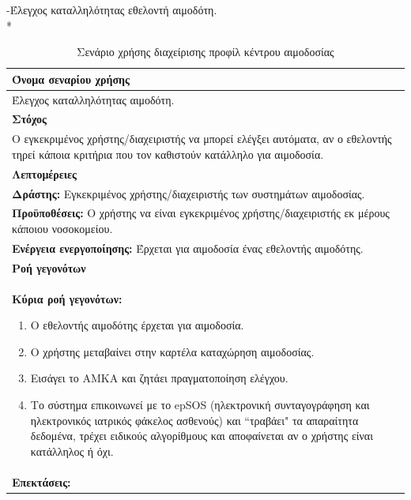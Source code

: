 \newpage
-Έλεγχος καταλληλότητας εθελοντή αιμοδότη.
\\*
\begin{table}[H]
	\begin{center}
	    \begin{tabular}{|p{\dimexpr \linewidth-2\tabcolsep}|}
	    \hline
	    \rowcolor{grayy}
	    \textbf{Όνομα σεναρίου χρήσης}
	    \\ \hline    
	    Έλεγχος καταλληλότητας αιμοδότη.
	     \\ \hline
	    \rowcolor{grayy}
	    \textbf{\textbf{Στόχος}}
	    \\ \hline
	 	 Ο εγκεκριμένος χρήστης/διαχειριστής να μπορεί ελέγξει αυτόματα, αν ο εθελοντής τηρεί κάποια κριτήρια που τον καθιστούν κατάλληλο για αιμοδοσία. 
	    \\ \hline
	    \rowcolor{grayy}
	    \textbf{Λεπτομέρειες}
	    \\ \hline
		\textbf{Δράστης:} Εγκεκριμένος χρήστης/διαχειριστής των συστημάτων αιμοδοσίας.
		\\*
		\textbf{Προϋποθέσεις:} Ο χρήστης να είναι εγκεκριμένος χρήστης/διαχειριστής εκ μέρους κάποιου νοσοκομείου.
		\\*
		\textbf{Ενέργεια ενεργοποίησης:} Έρχεται για αιμοδοσία ένας εθελοντής αιμοδότης.
		\\ \hline
		\rowcolor{grayy}    
	    \textbf{Ροή γεγονότων}
	    \\ \hline
		\textbf{Κύρια ροή γεγονότων:}
		\begin{enumerate}
			\item	 Ο εθελοντής αιμοδότης έρχεται για αιμοδοσία.
			\item Ο χρήστης μεταβαίνει στην καρτέλα καταχώρηση αιμοδοσίας.
			\item Εισάγει το ΑΜΚΑ και ζητάει πραγματοποίηση ελέγχου.
			\item Το σύστημα επικοινωνεί με το epSOS (ηλεκτρονική συνταγογράφηση και ηλεκτρονικός ιατρικός φάκελος ασθενούς) και ``τραβάει" τα απαραίτητα δεδομένα, τρέχει ειδικούς αλγορίθμους και αποφαίνεται αν ο χρήστης είναι κατάλληλος ή όχι.
		\end{enumerate}
		\\ \hline
		\rowcolor{grayy}
		\textbf{Επεκτάσεις:}
		   \\ \hline
	    \end{tabular}
	    \caption{Σενάριο χρήσης διαχείρισης προφίλ κέντρου αιμοδοσίας}
	    \label{tab:check_donor_eligibility}
	\end{center}
\end{table}	


